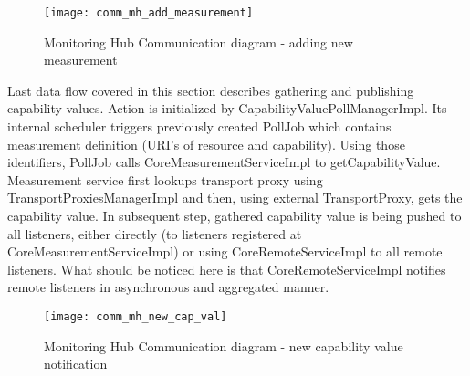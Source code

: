 \begin{figure}[ht]
\centering
\texttt{[image: comm\_mh\_add\_measurement]}
\caption{Monitoring Hub Communication diagram - adding new measurement}
\label{fig:comm_mh_add_measurement}
\end{figure}

Last data flow covered in this section describes gathering and publishing capability values. Action is initialized by CapabilityValuePollManagerImpl. Its internal scheduler triggers previously created PollJob which contains measurement definition (URI's of resource and capability). Using those identifiers, PollJob calls CoreMeasurementServiceImpl to getCapabilityValue. Measurement service first lookups transport proxy using TransportProxiesManagerImpl and then, using external TransportProxy, gets the capability value. In subsequent step, gathered capability value is being pushed to all listeners, either directly (to listeners registered at CoreMeasurementServiceImpl) or using CoreRemoteServiceImpl to all remote listeners. What should be noticed here is that CoreRemoteServiceImpl notifies remote listeners in asynchronous and aggregated manner.

\begin{figure}[ht]
\centering
\texttt{[image: comm\_mh\_new\_cap\_val]}
\caption{Monitoring Hub Communication diagram - new capability value notification}
\label{fig:comm_new_cap_val}
\end{figure}
\pagebreak
